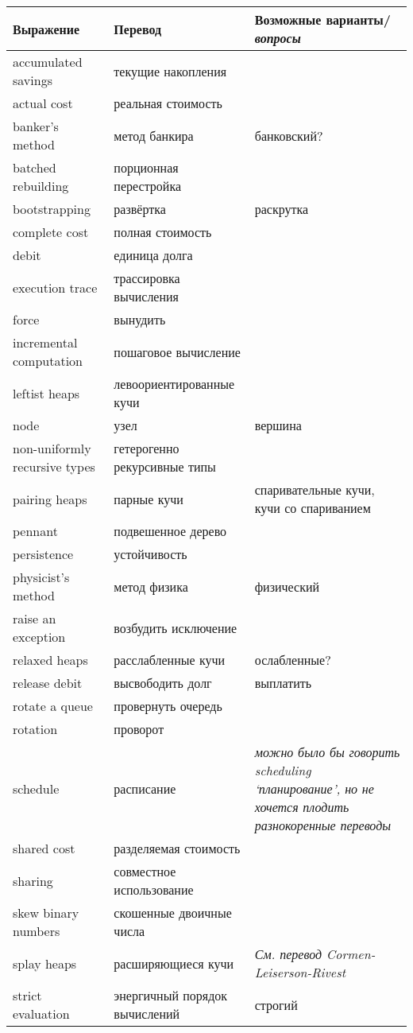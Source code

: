\documentclass{article}
\begin{document}
\begin{tabular}{p{3cm}|p{4cm}|p{5cm}}
Выражение & Перевод & Возможные варианты/\textit{вопросы} \\
\hline
accumulated savings & текущие накопления \\
actual cost & реальная стоимость \\
banker's method & метод банкира & банковский? \\
batched rebuilding & порционная перестройка \\
bootstrapping & развёртка & раскрутка \\
complete cost & полная стоимость \\
debit & единица долга \\
execution trace & трассировка вычисления \\
force & вынудить \\
incremental computation & пошаговое вычисление \\
leftist heaps & левоориентированные кучи \\
node & узел & вершина \\
non-uniformly recursive types & гетерогенно рекурсивные типы \\
pairing heaps & парные кучи & спаривательные кучи, кучи со спариванием
\\
pennant & подвешенное дерево \\
persistence & устойчивость \\
physicist's method & метод физика & физический \\
raise an exception & возбудить исключение \\
relaxed heaps & расслабленные кучи & ослабленные? \\
release debit & высвободить долг & выплатить \\
rotate a queue & провернуть очередь \\
rotation & проворот \\
schedule & расписание & \textit{можно было бы говорить
  \emph{scheduling} `планирование', но не хочется плодить
  разнокоренные переводы} \\
shared cost & разделяемая стоимость \\
sharing & совместное использование \\
skew binary numbers & скошенные двоичные числа \\
splay heaps & расширяющиеся кучи & \textit{См. перевод Cormen-Leiserson-Rivest}\\
strict evaluation & энергичный порядок вычислений & строгий \\

\end{tabular}
\end{document}
